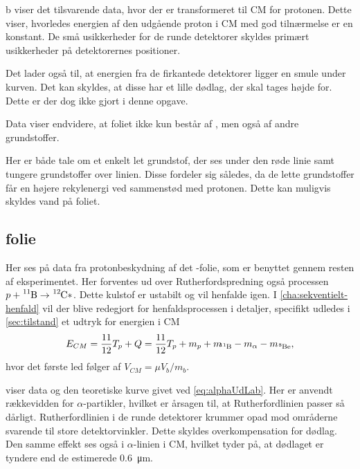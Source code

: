 b viser det tilsvarende data, hvor der er transformeret til CM for protonen. Dette
viser, hvorledes energien af den udgående proton i CM med god tilnærmelse er en konstant. De
små usikkerheder for de runde detektorer skyldes primært usikkerheder på detektorernes
positioner.

Det lader også til, at energien fra de firkantede detektorer ligger en smule under kurven. Det kan
skyldes, at disse har et lille dødlag, der skal tages højde for. Dette er der dog ikke gjort i
denne opgave.

Data viser endvidere, at foliet ikke kun består af \Carb, men også af andre
grundstoffer. %

Her er både tale om et enkelt let grundstof, der ses under den røde linie samt tungere grundstoffer
over linien. Disse fordeler sig således, da de lette grundstoffer får en højere rekylenergi ved
sammenstød med protonen. Dette kan muligvis skyldes vand på foliet. 

\subsection{\Bor folie}
\label{sec:tykt-folie}

Her ses på data fra protonbeskydning af det \Bor-folie, som er benyttet gennem resten af
eksperimentet. Her forventes ud over Rutherfordspredning også processen
$p + \Bor \rightarrow \Carb*$. Dette kulstof er ustabilt og vil henfalde igen. I
\cref{cha:sekventielt-henfald} vil der blive redegjort for henfaldsprocessen i detaljer, specifikt
udledes i \cref{sec:tilstand} et udtryk for energien i CM
\begin{equation}
  E_{CM} = \frac{11}{12} T_{p} + Q = \frac{11}{12} T_{p} + m_{p} + m_{\!\!\Bor} - m_{\alpha} - m_{\Be},
\end{equation}
hvor det første led følger af $V_{CM} = \mu V_{b} / m_{b}$. 

 viser data og den teoretiske kurve givet ved \cref{eq:alphaUdLab}. Her er anvendt
rækkevidden for $\alpha$-partikler, hvilket er årsagen til, at Rutherfordlinien passer så
dårligt. Rutherfordlinien i de runde detektorer krummer opad mod områderne svarende til store
detektorvinkler. Dette skyldes overkompensation for dødlag.  Den samme effekt ses også i $\alpha$-linien
i CM, hvilket tyder på, at dødlaget er tyndere end de estimerede \SI{0,6}{\um}.

